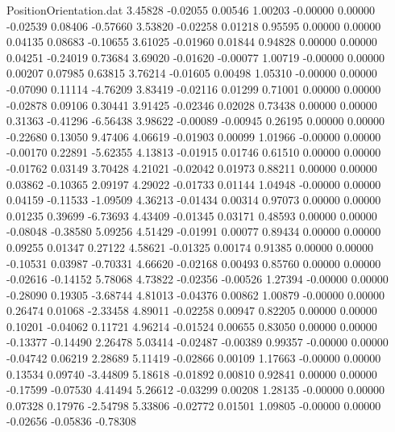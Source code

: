 \begin{filecontents}{PositionOrientation.dat}
   3.45828   -0.02055    0.00546     1.00203   -0.00000    0.00000   -0.02539    0.08406   -0.57660
   3.53820   -0.02258    0.01218     0.95595    0.00000    0.00000    0.04135    0.08683   -0.10655
   3.61025   -0.01960    0.01844     0.94828    0.00000    0.00000    0.04251   -0.24019    0.73684
   3.69020   -0.01620   -0.00077     1.00719   -0.00000    0.00000    0.00207    0.07985    0.63815
   3.76214   -0.01605    0.00498     1.05310   -0.00000    0.00000   -0.07090    0.11114   -4.76209
   3.83419   -0.02116    0.01299     0.71001    0.00000    0.00000   -0.02878    0.09106    0.30441
   3.91425   -0.02346    0.02028     0.73438    0.00000    0.00000    0.31363   -0.41296   -6.56438
   3.98622   -0.00089   -0.00945     0.26195    0.00000    0.00000   -0.22680    0.13050    9.47406
   4.06619   -0.01903    0.00099     1.01966   -0.00000    0.00000   -0.00170    0.22891   -5.62355
   4.13813   -0.01915    0.01746     0.61510    0.00000    0.00000   -0.01762    0.03149    3.70428
   4.21021   -0.02042    0.01973     0.88211    0.00000    0.00000    0.03862   -0.10365    2.09197
   4.29022   -0.01733    0.01144     1.04948   -0.00000    0.00000    0.04159   -0.11533   -1.09509
   4.36213   -0.01434    0.00314     0.97073    0.00000    0.00000    0.01235    0.39699   -6.73693
   4.43409   -0.01345    0.03171     0.48593    0.00000    0.00000   -0.08048   -0.38580    5.09256
   4.51429   -0.01991    0.00077     0.89434    0.00000    0.00000    0.09255    0.01347    0.27122
   4.58621   -0.01325    0.00174     0.91385    0.00000    0.00000   -0.10531    0.03987   -0.70331
   4.66620   -0.02168    0.00493     0.85760    0.00000    0.00000   -0.02616   -0.14152    5.78068
   4.73822   -0.02356   -0.00526     1.27394   -0.00000    0.00000   -0.28090    0.19305   -3.68744
   4.81013   -0.04376    0.00862     1.00879   -0.00000    0.00000    0.26474    0.01068   -2.33458
   4.89011   -0.02258    0.00947     0.82205    0.00000    0.00000    0.10201   -0.04062    0.11721
   4.96214   -0.01524    0.00655     0.83050    0.00000    0.00000   -0.13377   -0.14490    2.26478
   5.03414   -0.02487   -0.00389     0.99357   -0.00000    0.00000   -0.04742    0.06219    2.28689
   5.11419   -0.02866    0.00109     1.17663   -0.00000    0.00000    0.13534    0.09740   -3.44809
   5.18618   -0.01892    0.00810     0.92841    0.00000    0.00000   -0.17599   -0.07530    4.41494
   5.26612   -0.03299    0.00208     1.28135   -0.00000    0.00000    0.07328    0.17976   -2.54798
   5.33806   -0.02772    0.01501     1.09805   -0.00000    0.00000   -0.02656   -0.05836   -0.78308

\end{filecontents}
